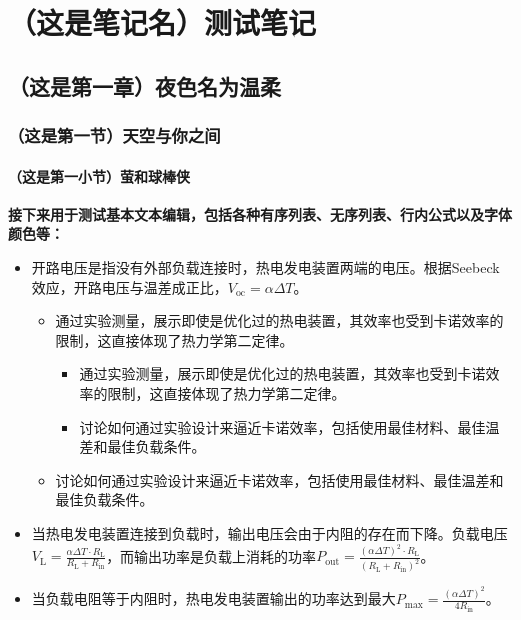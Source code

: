 
\chapter{（这是笔记名）测试笔记}
\section{（这是第一章）夜色名为温柔}

\subsection{（这是第一节）天空与你之间}

\subsubsection{（这是第一小节）萤和球棒侠}

\textbf{接下来用于测试基本文本编辑，包括各种有序列表、无序列表、行内公式以及字体颜色等：}

\begin{itemize}
	\item 开路电压是指没有外部负载连接时，热电发电装置两端的电压。根据Seebeck效应，开路电压与温差成正比，$V_{\text{oc}} = \alpha \Delta T$。
	
	\begin{itemize}
		\item \textcolor{fred}{通过实验测量，展示即使是优化过的热电装置，其效率也受到卡诺效率的限制，这直接体现了热力学第二定律。}
		\begin{itemize}
			\item \textcolor{fred}{通过实验测量，展示即使是优化过的热电装置，其效率也受到卡诺效率的限制，这直接体现了热力学第二定律。}
			\item 讨论如何通过实验设计来逼近卡诺效率，包括使用最佳材料、最佳温差和最佳负载条件。
		\end{itemize}			
		\item 讨论如何通过实验设计来逼近卡诺效率，包括使用最佳材料、最佳温差和最佳负载条件。
	\end{itemize}			
	
	\item 当热电发电装置连接到负载时，输出电压会由于内阻的存在而下降。负载电压$V_{\text{L}} = \frac{\alpha \Delta T \cdot R_{\text{L}}}{R_{\text{L}} + R_{\text{in}}}$，而输出功率是负载上消耗的功率$P_{\text{out}} = \frac{(\alpha \Delta T)^2 \cdot R_{\text{L}}}{(R_{\text{L}} + R_{\text{in}})^2}$。
	
	\item 当负载电阻等于内阻时，热电发电装置输出的功率达到最大$P_{\text{max}} = \frac{(\alpha \Delta T)^2}{4 R_{\text{in}}}$。				
\end{itemize}

